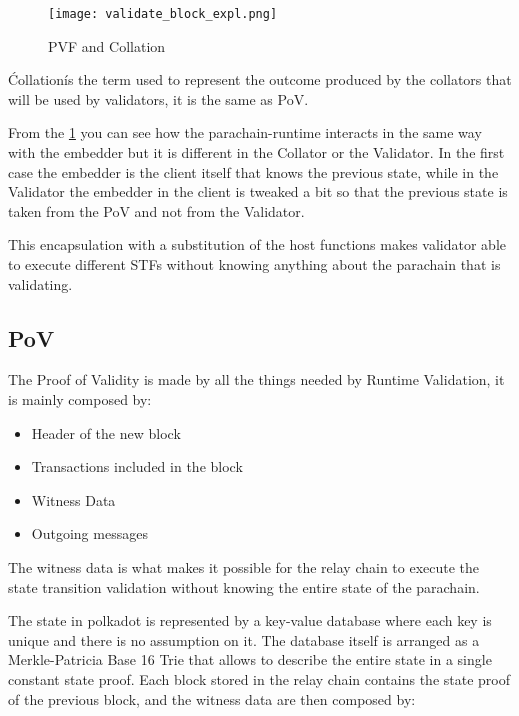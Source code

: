 \begin{figure}[h]
  \centering
  \texttt{[image: validate\_block\_expl.png]}
  \caption{PVF and Collation}
  \label{fig:pvf_pov}
\end{figure}

\'Collation\' is the term used to represent the outcome produced by the collators that will be used by validators, it is the same as PoV.


From the \ref{fig:pvf_pov} you can see how the parachain-runtime interacts in the same way with the embedder but it is different in the Collator or the Validator. In the first case the embedder is the client itself that knows the previous state, while in the Validator the embedder in the client is tweaked a bit so that the previous state is taken from the PoV and not from the Validator.

This encapsulation with a substitution of the host functions makes  validator able to execute different STFs without knowing anything about the parachain that is validating.

\subsection{PoV}

The Proof of Validity is made by all the things needed by Runtime Validation, it is mainly composed by:~\cite{cumulus-docs}

\begin{itemize}
  \item Header of the new block
  \item Transactions included in the block
  \item Witness Data
  \item Outgoing messages
\end{itemize}

The witness data is what makes it possible for the relay chain to execute the state transition validation without knowing the entire state of the parachain.

The state in polkadot is represented by a key-value database where each key is unique and there is no assumption on it. The database itself is arranged as a Merkle-Patricia Base 16 Trie that allows to describe the entire state in a single constant state proof. Each block stored in the relay chain contains the state proof of the previous block, and the witness data are then composed by:



